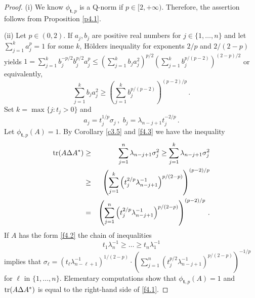 \documentclass{amsart}
\begin{document}
\begin{proof}
(i) We know ${\phi}_{{\mathbf t},p}$ is a Q-norm if $p \in [2,+\infty)$. Therefore, the assertion follows from Proposition \ref{p4.1}. 

(ii) Let $p \in (0,2)$. If $a_j, b_j$ are positive real numbers for $j \in \{1,\ldots,n\}$ and let $\sum_{j=1}^k a_j^p = 1$ for some $k$, H\"olders inequality for exponents $2/p$ and $2/(2-p)$ yields $1 = \sum_{j=1}^k b_j^{-p/2}b_j^{p/2}a_j^p \leq \left( \sum_{j=1}^k b_ja_j^2\right)^{p/2} \left( \sum_{j=1}^k b_j^{p/(p-2)} \right)^{(2-p)/2}$ or equivalently, 
\begin{equation} \label{f4.3}
             \sum_{j=1}^k b_ja_j^2 \geq \left( \sum_{j=1}^k b_j^{p/(p-2)} \right)^{(p-2)/p} \, .
\end{equation}
Set $k = \max \{ j : t_j > 0 \}$ and 
\begin{equation}   \label{f4.4}
       a_j=t_j^{1/p} \sigma_j \, , \,\, b_j=\lambda_{n-j+1}t_j^{-2/p} \, .
\end{equation}         
Let ${\phi}_{{\mathbf t},p}(A) = 1$. By Corollary \ref{c3.5} and \eqref{f4.3} we have the inequality
\begin{eqnarray} \label{f4.5}
       {\rm tr}(A \Delta A^*) & \geq  & \sum_{j=1}^n \lambda_{n-j+1} \sigma_j^2 \geq \sum_{j=1}^k  \lambda_{n-j+1} \sigma_j^2 \\
       & \geq &        \left( \sum_{j=1}^k \left( t_j^{2/p}\lambda_{n-j+1}^{-1} \right)^{p/(2-p)} \right)^{(p-2)/p}  \nonumber \\
       & = &        \left( \sum_{j=1}^n \left( t_j^{2/p}\lambda_{n-j+1}^{-1} \right)^{p/(2-p)} \right)^{(p-2)/p} \, . \nonumber
\end{eqnarray}
If $A$ has the form \eqref{f4.2} the chain of inequalities 
\begin{equation} \label{f4.6}
       t_1 \lambda_n^{-1} \geq \ldots \geq t_n \lambda_1^{-1}
\end{equation}
implies that $\sigma_\ell = \left( t_\ell \lambda_{n-\ell+1}^{-1} \right)^{1/(2-p)} \cdot \left( \sum_{j=1}^n ( t_j^{p/2} \lambda_{n-j+1}^{-1})^{p/(2-p)} \right)^{-1/p}$ for $\ell$ in 
\linebreak[4]
$\{ 1,\ldots,n\}$. Elementary computations show that ${\phi}_{{\mathbf t},p}(A)=1$ and ${\rm tr}(A \Delta A^*)$ is equal to the right-hand side of \eqref{f4.1}.              


\end{proof}
\end{document}
